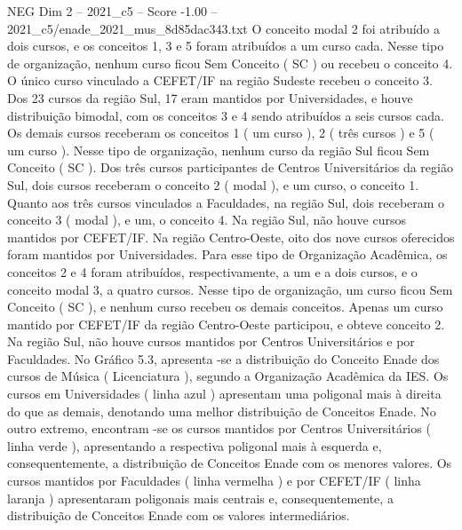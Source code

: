 \begin{textsample}{NEG Dim 2 – 2021\_c5 – Score -1.00 – 2021\_c5/enade\_2021\_mus\_8d85dac343.txt}
O conceito modal 2 foi atribuído a dois cursos, e os conceitos 1, 3 e 5 foram atribuídos a um curso cada.
Nesse tipo de organização, nenhum curso ficou Sem Conceito ( SC ) ou recebeu o conceito 4.
O único curso vinculado a CEFET/IF na região Sudeste recebeu o conceito 3.
Dos 23 cursos da região Sul, 17 eram mantidos por Universidades, e houve distribuição bimodal, com os conceitos 3 e 4 sendo atribuídos a seis cursos cada.
Os demais cursos receberam os conceitos 1 ( um curso ), 2 ( três cursos ) e 5 ( um curso ).
Nesse tipo de organização, nenhum curso da região Sul ficou Sem Conceito ( SC ).
Dos três cursos participantes de Centros Universitários da região Sul, dois cursos receberam o conceito 2 ( modal ), e um curso, o conceito 1.
Quanto aos três cursos vinculados a Faculdades, na região Sul, dois receberam o conceito 3 ( modal ), e um, o conceito 4.
Na região Sul, não houve cursos mantidos por CEFET/IF.
Na região Centro-Oeste, oito dos nove cursos oferecidos foram mantidos por Universidades.
Para esse tipo de Organização Acadêmica, os conceitos 2 e 4 foram atribuídos, respectivamente, a um e a dois cursos, e o conceito modal 3, a quatro cursos.
Nesse tipo de organização, um curso ficou Sem Conceito ( SC ), e nenhum curso recebeu os demais conceitos.
Apenas um curso mantido por CEFET/IF da região Centro-Oeste participou, e obteve conceito 2.
Na região Sul, não houve cursos mantidos por Centros Universitários e por Faculdades.
No Gráfico 5.3, apresenta -se a distribuição do Conceito Enade dos cursos de Música ( Licenciatura ), segundo a Organização Acadêmica da IES.
Os cursos em Universidades ( linha azul ) apresentam uma poligonal mais à direita do que as demais, denotando uma melhor distribuição de Conceitos Enade.
No outro extremo, encontram -se os cursos mantidos por Centros Universitários ( linha verde ), apresentando a respectiva poligonal mais à esquerda e, consequentemente, a distribuição de Conceitos Enade com os menores valores.
Os cursos mantidos por Faculdades ( linha vermelha ) e por CEFET/IF ( linha laranja ) apresentaram poligonais mais centrais e, consequentemente, a distribuição de Conceitos Enade com os valores intermediários.

\end{textsample}
